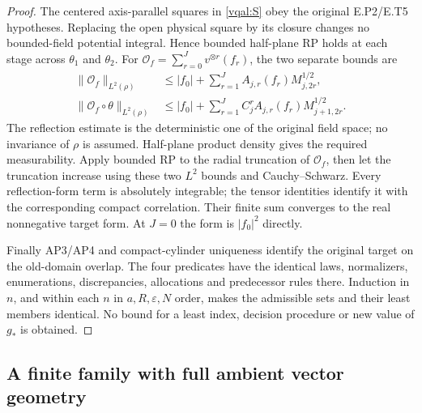 \documentclass[11pt]{article}
\theoremstyle{plain}
\theoremstyle{definition}
\theoremstyle{remark}
\newcommand{\cO}{\mathcal{O}}
\begin{document}
\begin{proof}
The centered axis-parallel squares in \eqref{vqal:S} obey the original
E.P2/E.T5 hypotheses. Replacing the open physical square by its closure
changes no bounded-field potential integral. Hence bounded half-plane
RP holds at each stage across $\theta_1$ and $\theta_2$. For
$\cO_f=\sum_{r=0}^Jv^{\otimes r}(f_r)$, the two separate bounds are
\begin{align}\label{vqal:RPnorms}
 \|\cO_f\|_{L^2(\rho)}
 &\le|f_0|+\sum_{r=1}^JA_{j,r}(f_r)M_{j,2r}^{1/2},\nonumber\\
 \|\cO_f\circ\theta\|_{L^2(\rho)}
 &\le|f_0|+\sum_{r=1}^JC_j^r
                          A_{j,r}(f_r)M_{j+1,2r}^{1/2}.
\end{align}
The reflection estimate is the deterministic one of the original field
space; no invariance of $\rho$ is assumed. Half-plane product density
gives the required measurability. Apply bounded RP to the radial
truncation of $\cO_f$, then let the truncation increase using these
two $L^2$ bounds and Cauchy--Schwarz. Every reflection-form term is
absolutely integrable; the tensor identities identify it with the
corresponding compact correlation. Their finite sum converges to the
real nonnegative target form. At $J=0$ the form is $|f_0|^2$ directly.

Finally AP3/AP4 and compact-cylinder uniqueness identify the original
target on the old-domain overlap. The four predicates have the identical
laws, normalizers, enumerations, discrepancies, allocations and
predecessor rules there. Induction in $n$, and within each $n$ in
$a,R,\varepsilon,N$ order, makes the admissible sets and their least
members identical. No bound for a least index, decision procedure or
new value of $g_*$ is obtained.
\end{proof}

\subsection{A finite family with full ambient vector geometry}
\label{vqal:family}
\end{document}
